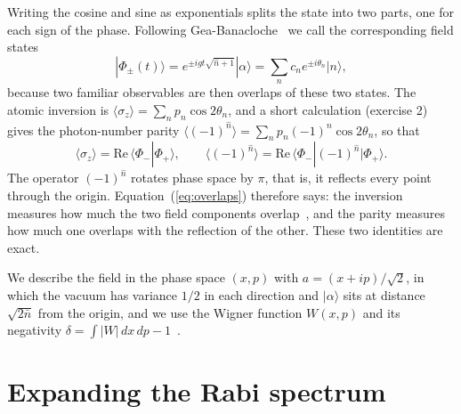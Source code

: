 \documentclass{iopjournal}
\newcommand{\nbar}{\bar{n}}
\newcommand{\ket}[1]{|#1\rangle}
\newcommand{\bra}[1]{\langle #1|}
\newcommand{\braket}[2]{\langle #1|#2\rangle}
\begin{document}
Writing the cosine and sine as exponentials splits the state into two parts, one for each sign of the phase. Following Gea-Banacloche~\cite{gea-banacloche1991} we call the corresponding field states
\begin{equation}
\ket{\Phi_\pm(t)} = e^{\pm i gt\sqrt{\hat{n}+1}}\ket{\alpha} = \sum_n c_n e^{\pm i\theta_n}\ket{n},
\label{eq:branches}
\end{equation}
because two familiar observables are then overlaps of these two states. The atomic inversion is $\langle\sigma_z\rangle = \sum_n p_n\cos 2\theta_n$, and a short calculation (exercise 2) gives the photon-number parity $\langle(-1)^{\hat n}\rangle = \sum_n p_n(-1)^n\cos 2\theta_n$, so that
\begin{equation}
\langle\sigma_z\rangle = \mathrm{Re}\,\braket{\Phi_-}{\Phi_+},\qquad
\langle(-1)^{\hat{n}}\rangle = \mathrm{Re}\,\bra{\Phi_-}(-1)^{\hat{n}}\ket{\Phi_+}.
\label{eq:overlaps}
\end{equation}
The operator $(-1)^{\hat n}$ rotates phase space by $\pi$, that is, it reflects every point through the origin. Equation~(\ref{eq:overlaps}) therefore says: the inversion measures how much the two field components overlap~\cite{gea-banacloche1991, auffeves2003}, and the parity measures how much one overlaps with the reflection of the other. These two identities are exact.

We describe the field in the phase space $(x,p)$ with $a = (x+ip)/\sqrt{2}$, in which the vacuum has variance $1/2$ in each direction and $\ket{\alpha}$ sits at distance $\sqrt{2\nbar}$ from the origin, and we use the Wigner function $W(x,p)$ and its negativity $\delta = \int|W|\,dx\,dp - 1$~\cite{kenfack2004}.

\section{Expanding the Rabi spectrum}
\label{sec:orders}
\end{document}
